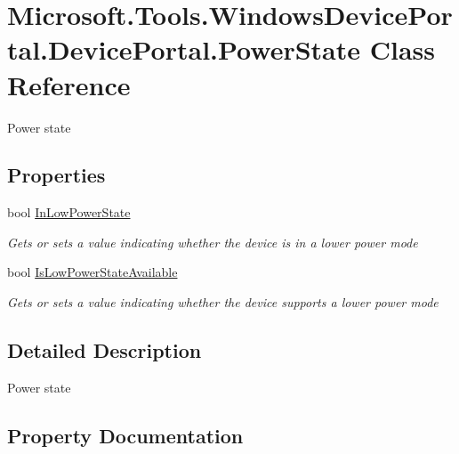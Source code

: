 \hypertarget{class_microsoft_1_1_tools_1_1_windows_device_portal_1_1_device_portal_1_1_power_state}{}\section{Microsoft.\+Tools.\+Windows\+Device\+Portal.\+Device\+Portal.\+Power\+State Class Reference}
\label{class_microsoft_1_1_tools_1_1_windows_device_portal_1_1_device_portal_1_1_power_state}


Power state  


\subsection*{Properties}
\begin{DoxyCompactItemize}
\item 
bool \hyperlink{class_microsoft_1_1_tools_1_1_windows_device_portal_1_1_device_portal_1_1_power_state_a578615fa1f1d0af9c3c5495f2ab1f1ea}{In\+Low\+Power\+State}
\begin{DoxyCompactList}\small\item\em Gets or sets a value indicating whether the device is in a lower power mode \end{DoxyCompactList}\item 
bool \hyperlink{class_microsoft_1_1_tools_1_1_windows_device_portal_1_1_device_portal_1_1_power_state_ac5f3c2dbef909d8504bf2c3b9ec9e459}{Is\+Low\+Power\+State\+Available}
\begin{DoxyCompactList}\small\item\em Gets or sets a value indicating whether the device supports a lower power mode \end{DoxyCompactList}\end{DoxyCompactItemize}


\subsection{Detailed Description}
Power state 



\subsection{Property Documentation}
